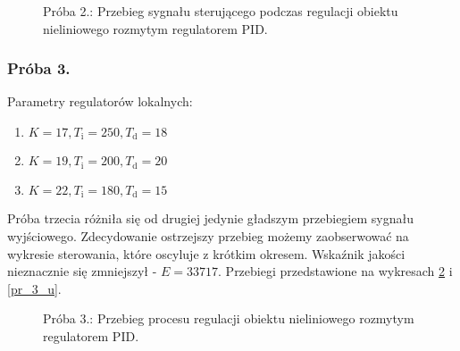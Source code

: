 \begin{figure}[b]
    \centering
    \caption{Próba 2.: Przebieg sygnału sterującego podczas regulacji obiektu nieliniowego rozmytym regulatorem PID.}
    \label{pr_2_u}
\end{figure}


\subsubsection{Próba 3.}
Parametry regulatorów lokalnych:
\begin{enumerate}
\item $K = 17, T_{\mathrm{i}} = 250,  T_{\mathrm{d}} = 18$
\item $K = 19, T_{\mathrm{i}} = 200,  T_{\mathrm{d}} = 20$
\item $K = 22, T_{\mathrm{i}} = 180,  T_{\mathrm{d}} = 15$
\end{enumerate}
Próba trzecia różniła się od drugiej jedynie gładszym przebiegiem sygnału wyjściowego. Zdecydowanie ostrzejszy przebieg możemy zaobserwować na wykresie sterowania, które oscyluje z krótkim okresem. Wskaźnik jakości nieznacznie się zmniejszył - $E = \num{33717}$. Przebiegi przedstawione na wykresach \ref{pr_3_y} i \ref{pr_3_u}.

\begin{figure}[t]
    \centering
    \caption{Próba 3.: Przebieg procesu regulacji obiektu nieliniowego rozmytym regulatorem PID.}
    \label{pr_3_y}
\end{figure}

